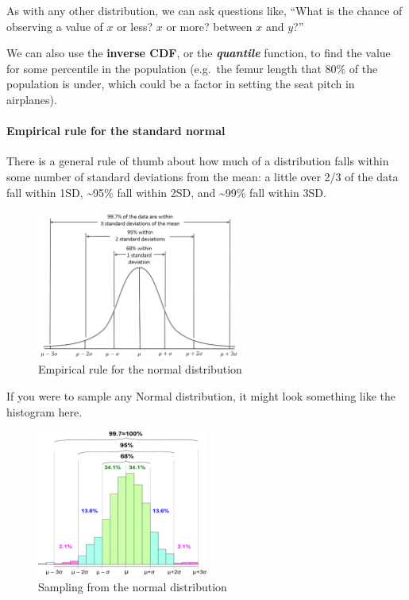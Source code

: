 \documentclass[
]{article}
\begin{document}
As with any other distribution, we can ask questions like, ``What is the
chance of observing a value of \(x\) or less? \(x\) or more? between
\(x\) and \(y\)?''

We can also use the \textbf{inverse CDF}, or the
\textbf{\emph{quantile}} function, to find the value for some percentile
in the population (e.g.~the femur length that 80\% of the population is
under, which could be a factor in setting the seat pitch in airplanes).

\hypertarget{empirical-rule-for-the-standard-normal}{%
\paragraph{Empirical rule for the standard
normal}\label{empirical-rule-for-the-standard-normal}}

There is a general rule of thumb about how much of a distribution falls
within some number of standard deviations from the mean: a little over
2/3 of the data fall within 1SD, \textasciitilde95\% fall within 2SD,
and \textasciitilde99\% fall within 3SD.

\begin{figure}
\centering
\includegraphics[width=0.6\textwidth,height=\textheight]{Images/Empirical_Rule.png}
\caption{Empirical rule for the normal distribution}
\end{figure}

If you were to sample any Normal distribution, it might look something
like the histogram here.

\begin{figure}
\centering
\includegraphics[width=0.5\textwidth,height=\textheight]{Images/Empirical_Rule_Histogram.png}
\caption{Sampling from the normal distribution}
\end{figure}
\end{document}
